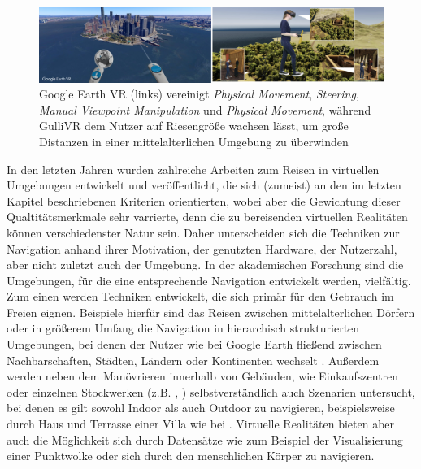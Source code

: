 \begin{figure}[h!]
  \centering
  \includegraphics[width=\textwidth]{images/google_gulli.jpg}
  \caption{Google Earth VR (links) vereinigt \textit{Physical Movement}, \textit{Steering}, \textit{Manual Viewpoint Manipulation} und \textit{Physical Movement}, während GulliVR\cite{Krekhov2018GulliVR} dem Nutzer auf Riesengröße wachsen lässt, um große Distanzen  in einer mittelalterlichen Umgebung zu überwinden}
  \label{fig:todo}
\end{figure}

In den letzten Jahren wurden zahlreiche Arbeiten zum Reisen in virtuellen Umgebungen entwickelt und veröffentlicht, die sich (zumeist) an den im letzten Kapitel beschriebenen Kriterien orientierten, wobei aber die Gewichtung dieser Qualtitätsmerkmale sehr varrierte, denn die zu bereisenden virtuellen Realitäten können verschiedenster Natur sein. Daher unterscheiden sich die Techniken zur Navigation anhand ihrer Motivation, der genutzten Hardware, der Nutzerzahl, aber nicht zuletzt auch der Umgebung.
In der akademischen Forschung sind die Umgebungen, für die eine entsprechende Navigation entwickelt werden, vielfältig.
Zum einen werden Techniken entwickelt, die sich primär für den Gebrauch im Freien eignen. Beispiele hierfür sind das Reisen zwischen mittelalterlichen Dörfern \cite{Krekhov2018GulliVR} oder in größerem Umfang die Navigation in hierarchisch strukturierten Umgebungen, bei denen der Nutzer wie bei Google Earth fließend zwischen Nachbarschaften, Städten, Ländern oder Kontinenten wechselt \cite{pierce_representations}.
Außerdem werden neben dem Manövrieren innerhalb von Gebäuden, wie Einkaufszentren oder einzelnen Stockwerken (z.B. \cite{Richardson1999}, \cite{Liang2018EvaluatingEnvironments}) selbstverständlich auch Szenarien untersucht, bei denen es gilt sowohl Indoor als auch Outdoor zu navigieren, beispielsweise durch Haus und Terrasse einer Villa wie bei \cite{Dallat2018Giant}. 
Virtuelle Realitäten bieten aber auch die Möglichkeit sich durch Datensätze wie zum Beispiel der Visualisierung einer Punktwolke oder sich durch den menschlichen Körper \cite{Kopper2006DesignEnvironments} zu navigieren.

